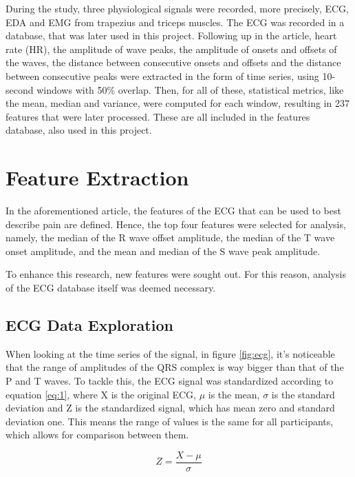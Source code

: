 During the study, three physiological signals were recorded, more precisely, ECG, EDA and EMG from trapezius and triceps muscles. The ECG was recorded in a database, that was later used in this project.
Following up in the article, heart rate (HR), the amplitude of wave peaks, the amplitude of onsets and offsets of the waves, the distance between consecutive onsets and offsets and the distance between consecutive peaks were extracted in the form of time series, using 10-second windows with 50\% overlap. 
Then, for all of these, statistical metrics, like the mean, median and variance, were computed for each window, resulting in 237 features that were later processed. 
These are all included in the features database, also used in this project.



\section{Feature Extraction}
In the aforementioned article, the features of the ECG that can be used to best describe pain are defined.
Hence, the top four features were selected for analysis, namely, the median of the R wave offset amplitude, the median of the T wave onset amplitude, and the mean and median of the S wave peak amplitude.

To enhance this research, new features were sought out. 
For this reason, analysis of the ECG database itself was deemed necessary. 


\subsection{ECG Data Exploration}
When looking at the time series of the signal, in figure \ref{fig:ecg}, it's noticeable that the range of amplitudes of the QRS complex is way bigger than that of the P and T waves.
To tackle this, the ECG signal was standardized according to equation \ref{eq:1}, where X is the original ECG, $\mu$ is the mean, $\sigma$ is the standard deviation and Z is the standardized signal, which has mean zero and standard deviation one. 
This means the range of values is the same for all participants, which allows for comparison between them.

\begin{equation} \label{eq:1}
Z = \frac{X-\mu}{\sigma}
\end{equation}


